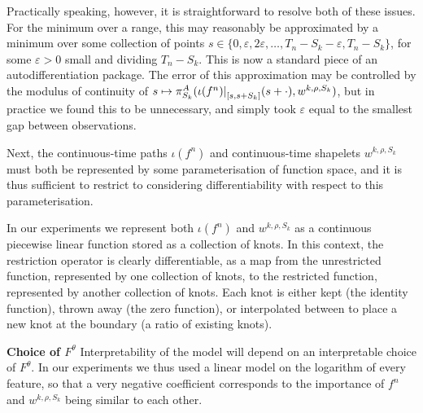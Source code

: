 \documentclass{article}
\theoremstyle{plain}
\theoremstyle{definition}
\newcommand{\reals}{\mathbb{R}}
\newcommand{\restr}[2]{{\left.\kern-\nulldelimiterspace #1 \right|_{#2}}}
\newcommand{\boldheading}[1]{

\textbf{#1}\quad}
\begin{document}
	Practically speaking, however, it is straightforward to resolve both of these issues. For the minimum over a range, this may reasonably be approximated by a minimum over some collection of points $s \in \{0, \varepsilon, 2 \varepsilon, \ldots, T_n - S_k - \varepsilon, T_n - S_k\}$, for some $\varepsilon > 0$ small and dividing $T_n - S_k$. This is now a standard piece of an autodifferentiation package. The error of this approximation may be controlled by the modulus of continuity of $s \mapsto \pi^A_{S_k}(\restr{\iota(f^n)}{[s, s + S_k]}(s + \cdot), w^{k, \rho, S_k})$, but in practice we found this to be unnecessary, and simply took $\varepsilon$ equal to the smallest gap between observations.
	
	Next, the continuous-time paths $\iota(f^n)$ and continuous-time shapelets $w^{k, \rho, S_k}$ must both be represented by some parameterisation of function space, and it is thus sufficient to restrict to considering differentiability with respect to this parameterisation.
	
	In our experiments we represent both $\iota(f^n)$ and $w^{k, \rho, S_k}$ as a continuous piecewise linear function stored as a collection of knots. In this context, the restriction operator is clearly differentiable, as a map from the unrestricted function, represented by one collection of knots, to the restricted function, represented by another collection of knots. Each knot is either kept (the identity function), thrown away (the zero function), or interpolated between to place a new knot at the boundary (a ratio of existing knots).

	
	\boldheading{Choice of $F^\theta$}\label{section:choice-of-f}
	Interpretability of the model will depend on an interpretable choice of $F^\theta$. In our experiments we thus used a linear model on the logarithm of every feature, so that a very negative coefficient corresponds to the importance of $f^n$ and $w^{k, \rho, S_k}$ being similar to each other.
	
\end{document}
